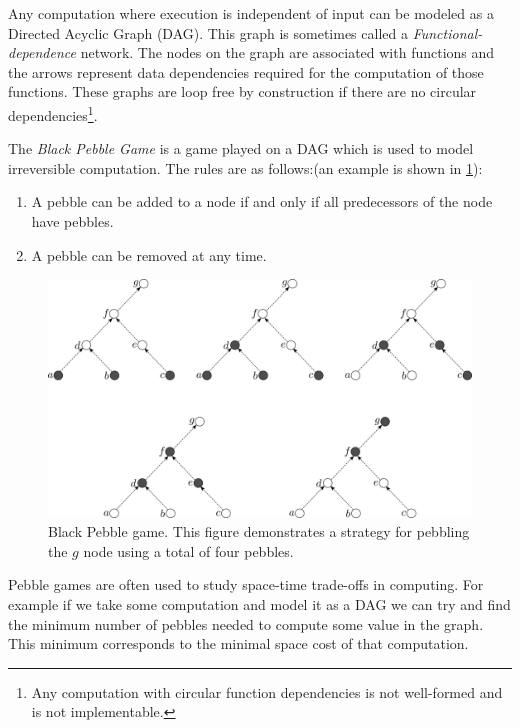 Any computation where execution is independent of input can be modeled as a
Directed Acyclic Graph (DAG). This graph is sometimes called a
\emph{Functional-dependence} network.  The nodes on the graph are associated
with functions and the arrows represent data dependencies required for the
computation of those functions. These graphs are loop free by construction if
there are no circular dependencies\footnote{Any computation with circular
function dependencies is not well-formed and is not implementable.}.

The \emph{Black Pebble Game} is a game played on a DAG which is used to model
irreversible computation. The rules are as follows:(an example is shown in
\cref{fig:black-peb-game}):

\begin{enumerate}
  \item A pebble can be added to a node if and only if all predecessors of the
    node have pebbles.
  \item A pebble can be removed at any time.
\end{enumerate}

\begin{figure}
      \capstart
      \centering
      \includegraphics[width=0.9\hsize]{images/black-peb-game}

      \caption{Black Pebble game. This figure demonstrates a strategy for
      pebbling the $g$ node using a total of four pebbles.}

      \label{fig:black-peb-game}
\end{figure}

Pebble games are often used to study space-time trade-offs in computing. For
example if we take some computation and model it as a DAG we can try and find
the minimum number of pebbles needed to compute some value in the graph. This
minimum corresponds to the minimal space cost of that computation.

